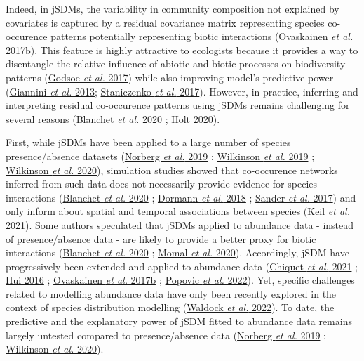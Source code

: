 \documentclass[9pt,biorxiv,doublespacing,lineno,endfloat]{lapreprint}
\begin{document}
Indeed, in jSDMs, the variability in community composition not explained
by covariates is captured by a residual covariance matrix representing
species co-occurence patterns potentially representing biotic
interactions (\protect\hyperlink{ref-Ovaskainen_2017a}{Ovaskainen
\emph{et al.} 2017b}). This feature is highly attractive to ecologists
because it provides a way to disentangle the relative influence of
abiotic and biotic processes on biodiversity patterns
(\protect\hyperlink{ref-Godsoe_2017}{Godsoe \emph{et al.} 2017}) while
also improving model's predictive power
(\protect\hyperlink{ref-Giannini_2013}{Giannini \emph{et al.} 2013};
\protect\hyperlink{ref-Staniczenko_2017}{Staniczenko \emph{et al.}
2017}). However, in practice, inferring and interpreting residual
co-occurence patterns using jSDMs remains challenging for several
reasons (\protect\hyperlink{ref-Blanchet_2020}{Blanchet \emph{et al.}
2020} ; \protect\hyperlink{ref-Holt_2020}{Holt 2020}).

First, while jSDMs have been applied to a large number of species
presence/absence datasets (\protect\hyperlink{ref-Norberg_2019}{Norberg
\emph{et al.} 2019} ; \protect\hyperlink{ref-Wilkinson_2019}{Wilkinson
\emph{et al.} 2019} ; \protect\hyperlink{ref-Wilkinson_2020}{Wilkinson
\emph{et al.} 2020}), simulation studies showed that co-occurence
networks inferred from such data does not necessarily provide evidence
for species interactions (\protect\hyperlink{ref-Blanchet_2020}{Blanchet
\emph{et al.} 2020} ; \protect\hyperlink{ref-Dormann_2018}{Dormann
\emph{et al.} 2018} ; \protect\hyperlink{ref-Sander_2017}{Sander
\emph{et al.} 2017}) and only inform about spatial and temporal
associations between species (\protect\hyperlink{ref-Keil_2021}{Keil
\emph{et al.} 2021}). Some authors speculated that jSDMs applied to
abundance data - instead of presence/absence data - are likely to
provide a better proxy for biotic interactions
(\protect\hyperlink{ref-Blanchet_2020}{Blanchet \emph{et al.} 2020} ;
\protect\hyperlink{ref-Momal_2020}{Momal \emph{et al.} 2020}).
Accordingly, jSDM have progressively been extended and applied to
abundance data (\protect\hyperlink{ref-Chiquet_2021}{Chiquet \emph{et
al.} 2021} ; \protect\hyperlink{ref-Hui_2016}{Hui 2016} ;
\protect\hyperlink{ref-Ovaskainen_2017a}{Ovaskainen \emph{et al.} 2017b}
; \protect\hyperlink{ref-Popovic_2022}{Popovic \emph{et al.} 2022}).
Yet, specific challenges related to modelling abundance data have only
been recently explored in the context of species distribution modelling
(\protect\hyperlink{ref-Waldock_2022}{Waldock \emph{et al.} 2022}). To
date, the predictive and the explanatory power of jSDM fitted to
abundance data remains largely untested compared to presence/absence
data (\protect\hyperlink{ref-Norberg_2019}{Norberg \emph{et al.} 2019} ;
\protect\hyperlink{ref-Wilkinson_2020}{Wilkinson \emph{et al.} 2020}).
\end{document}
